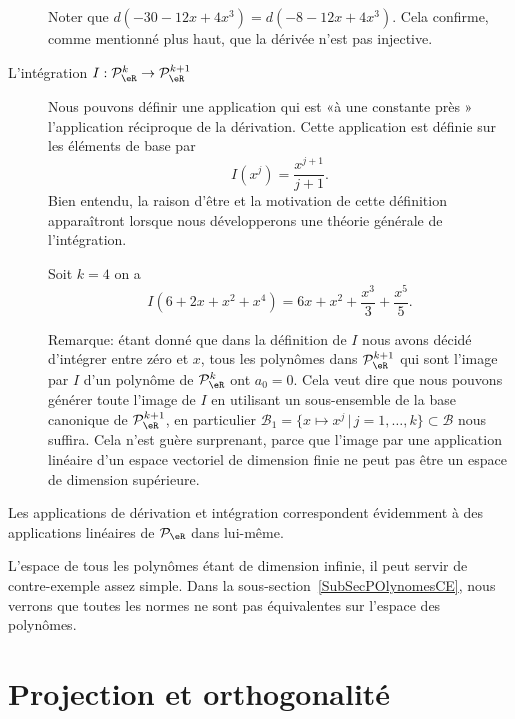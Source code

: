 \begin{description}
\begin{example}
		      Noter que \( d(-30-12x+4x^3)=d(-8-12x+4x^3)\). Cela confirme, comme mentionné plus haut, que la dérivée n'est pas injective.
	      \end{example}
	\item[L'intégration \( I: \mathcal{P}_\eR^k \to \mathcal{P}_\eR^{k+1}\)] Nous pouvons définir une application qui est «à une constante près » l'application réciproque de la dérivation. Cette application est définie sur les éléments de base par
	      \begin{equation}
		      I(x^j)= \frac{x^{j+1}}{j+1}.
	      \end{equation}
	      Bien entendu, la raison d'être et la motivation de cette définition apparaîtront lorsque nous développerons une théorie générale de l'intégration.

	      \begin{example}
		      Soit \( k=4\) on a
		      \begin{equation}
			      I(6+2x+x^2+x^4)= 6x+x^2+\frac{x^3}{3}+\frac{x^5}{5}.
		      \end{equation}
	      \end{example}

	      Remarque: étant donné que dans la définition de \( I\) nous avons décidé d'intégrer entre zéro et \( x\), tous les polynômes dans \( \mathcal{P}_\eR^{k+1}\) qui sont l'image par \( I\) d'un polynôme de \( \mathcal{P}_\eR^{k}\) ont \( a_0=0\). Cela veut dire que nous pouvons générer toute l'image de \( I\) en utilisant un sous-ensemble de la base canonique de \( \mathcal{P}_\eR^{k+1}\), en particulier \( \mathcal{B}_1=\{x\mapsto x^j \,|\, j=1, \ldots, k\}\subset \mathcal{B}\) nous suffira. Cela n'est guère surprenant, parce que l'image par une application linéaire d'un espace vectoriel de dimension finie ne peut pas être un espace de dimension supérieure.
\end{description}

Les applications de dérivation et intégration correspondent évidemment à des applications linéaires de \( \mathcal{P}_\eR\) dans lui-même.

L'espace de tous les polynômes étant de dimension infinie, il peut servir de contre-exemple assez simple. Dans la sous-section~\ref{SubSecPOlynomesCE}, nous verrons que toutes les normes ne sont pas équivalentes sur l'espace des polynômes.

\section{Projection et orthogonalité}

